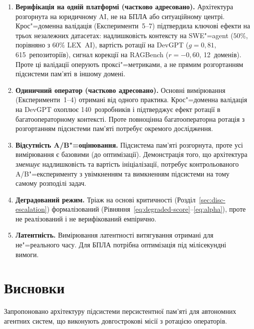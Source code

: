 \documentclass[11pt]{article}
\begin{document}
\begin{enumerate}[label=(\roman*), nosep]
  \item \textbf{Верифікація на одній платформі (частково адресовано).} Архітектура розгорнута на юридичному AI, не на БПЛА або ситуаційному центрі.
  Крос"=доменна валідація (Експерименти~5--7) підтвердила ключові ефекти на трьох незалежних датасетах: надлишковість контексту на SWE"=agent ($50\%$, порівняно з $60\%$ LEX~AI), вартість ротації на DevGPT ($g{=}0{,}81$, 615~репозиторіїв), сигнал корекції на RAGBench ($r{=}{-}0{,}60$, 12~доменів).
  Проте ці валідації оперують проксі"=метриками, а не прямим розгортанням підсистеми пам'яті в іншому домені.
  \item \textbf{Одиничний оператор (частково адресовано).} Основні вимірювання (Експерименти~1--4) отримані від одного практика. Крос"=доменна валідація на DevGPT охоплює 140~розробників і підтверджує ефект ротації в багатооператорному контексті.
  Проте повноцінна багатооператорна ротація з розгортанням підсистеми пам'яті потребує окремого дослідження.
  \item \textbf{Відсутність A/B"=оцінювання.} Підсистема пам'яті розгорнута, проте усі вимірювання є базовими (до оптимізації). Демонстрація того, що архітектура \emph{зменшує} надлишковість та вартість ініціалізації, потребує контрольованого A/B"=експерименту з увімкненням та вимкненням підсистеми на тому самому розподілі задач.
  \item \textbf{Деградований режим.} Тріаж на основі критичності (Розділ~\ref{sec:disc-escalation}) формалізований (Рівняння~\ref{eq:degraded-score}--\ref{eq:alpha}), проте не реалізований і не верифікований емпірично.
  \item \textbf{Латентність.} Вимірювання латентності витягування отримані для не"=реального часу. Для БПЛА потрібна оптимізація під мілісекундні вимоги.
\end{enumerate}


\section{Висновки}
\label{sec:conclusion}

Запропоновано архітектуру підсистеми персистентної пам'яті для автономних агентних систем, що виконують довгострокові місії з ротацією операторів.
\end{document}
